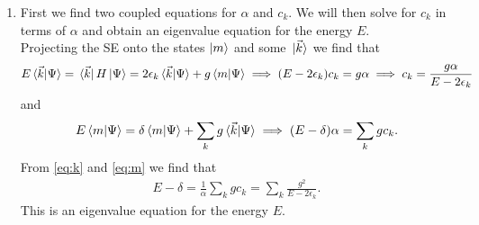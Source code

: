 \documentclass{article}
\theoremstyle{definition}
\newcommand{\al}{\alpha}
\newcommand{\f}[2]{\frac{#1}{#2}}
\begin{document}
\begin{enumerate}[label=(\alph*)]

\item First we find two coupled equations for $\al$ and $c_{{k}}$. We will then solve for $c_{{k}}$ in terms of $\al$ and obtain an eigenvalue equation for the energy $E$. \\

\noindent Projecting the SE onto the states $\ket{m}$ and some $\ket*{\vec{k}}$ we find that
\begin{align}\label{eq:k}
E \braket*{\vec{k}}{\Psi} = \bra*{\vec{k}} H \ket{\Psi} = 2\epsilon_k \braket*{\vec{k}}{\Psi} + g \braket*{m}{\Psi}
\implies (E - 2\epsilon_k )c_{{k}} =  g \al \implies c_k = \f{g\al}{E - 2\epsilon_k}
\end{align}
and
\begin{align}\label{eq:m}
E \braket*{m}{\Psi} = \delta \braket*{m}{\Psi} + \sum_k g \braket*{\vec{k}}{ \Psi } \implies (E - \delta)\al = \sum_k g c_k.
\end{align}
From \eqref{eq:k} and \eqref{eq:m} we find that
\begin{align*}
E - \delta = \f{1}{\al} \sum_{k} g c_k = \sum_k  \f{g^2}{ E - 2 \epsilon_k}.
\end{align*}
This is an eigenvalue equation for the energy $E$. 





\end{enumerate}
\end{document}
